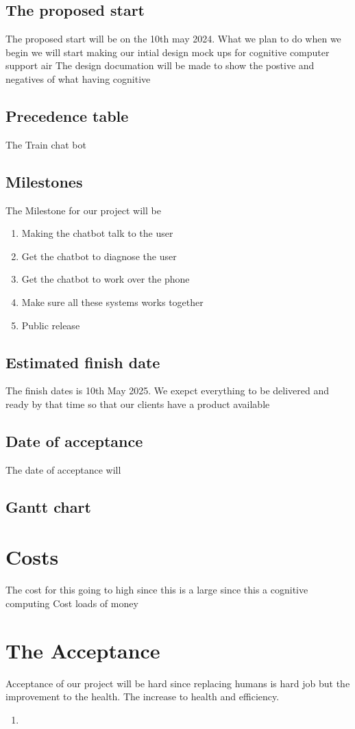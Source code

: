 \documentclass{article}
\begin{document}
\subsection{The proposed start}
The proposed start will be on the 10th may 2024. What we plan to do when we begin we will start making our intial design mock ups for cognitive computer support air
The design documation will be made to show the postive and negatives of what having cognitive 

\subsection{Precedence table}
The 
Train chat bot

\subsection{Milestones}
The Milestone for our project will be 
	\begin{enumerate}
		\item Making the chatbot talk to the user
		\item Get the chatbot to diagnose the user
		\item Get the chatbot to work over the phone
		\item Make sure all these systems works together
		\item Public release
	\end{enumerate}

\subsection{Estimated finish date}

The finish dates is 10th May 2025. We exepct everything to be delivered and ready by that time so that our clients have a product available 

\subsection{Date of acceptance}
The date of acceptance will 

\subsection{Gantt chart}







\section{Costs}
The cost for this going to high since this is a large since this a cognitive computing 
Cost loads of money

\section{The Acceptance}
Acceptance of our project will be hard since replacing humans is hard job but the improvement to the health. The increase to health and efficiency.

\begin{enumerate}
    \item 
\end{enumerate}
\end{document}
